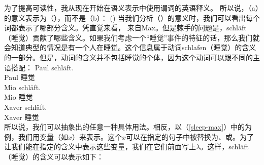 \noindent
为了提高可读性，我从现在开始在语义表示中使用谓词的英语释义。
所以说，（a）的意义表示为（），而不是（b）：
\ea
\label{sleep-max}
()
\z
当我们分析（）的意义时，我们可以看出每个词都表示了哪部分含义。凭直觉来看， 来自Max。但是棘手的问题是，schläft（睡觉）贡献了哪些含义。如果我们考虑一个“睡觉”事件的特征的话，那么我们就会知道典型的情况是有一个人在睡觉。这个信息属于动词schlafen（睡觉）的含义的一部分。但是，动词的含义并不包括睡觉的个体，因为这个动词可以跟不同的主语搭配：
\addlines
\eal
\ex 
\gll Paul schläft.\\
     Paul 睡觉\\
\ex 
\gll Mio schläft.\\
     Mio 睡觉\\
\ex 
\gll Xaver schläft.\\
     Xaver 睡觉\\
\zl
所以说，我们可以抽象出的任意一种具体用法。相反，以（\ref{sleep-max}）中的为例，我们用变量（如$x$）来表示。这个$x$可以在指定的句子中被替换为、或。为了让我们能在指定的含义中表示这些变量，我们在它们前面写上$\lambda$。这样，schläft（睡觉）的含义可以表示如下：
